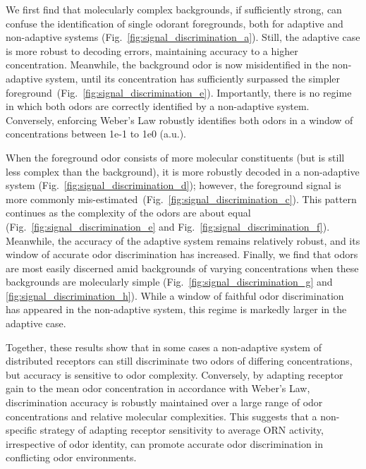 We first find that molecularly complex backgrounds, if sufficiently strong, can confuse the identification of single odorant foregrounds, both for adaptive and non-adaptive systems (Fig.~\ref{fig:signal_discrimination_a}). Still, the adaptive case is more robust to decoding errors, maintaining accuracy to a higher concentration. Meanwhile, the background odor is now misidentified in the non-adaptive system, until its concentration has sufficiently surpassed the simpler foreground~(Fig.~\ref{fig:signal_discrimination_e}). Importantly, there is no regime in which both odors are correctly identified by a non-adaptive system. Conversely, enforcing Weber's Law robustly identifies both odors in a window of concentrations between 1e-1 to 1e0 (a.u.).

When the foreground odor consists of more molecular constituents (but is still less complex than the background), it is more robustly decoded in a non-adaptive system (Fig.~\ref{fig:signal_discrimination_d}); however, the foreground signal is more commonly mis-estimated~(Fig.~\ref{fig:signal_discrimination_c}). This pattern continues as the complexity of the odors are about equal (Fig.~\ref{fig:signal_discrimination_e} and Fig.~\ref{fig:signal_discrimination_f}). Meanwhile, the accuracy of the adaptive system remains relatively robust, and its window of accurate odor discrimination has increased. Finally, we find that odors are most easily discerned amid backgrounds of varying concentrations when these backgrounds are molecularly simple (Fig.~\ref{fig:signal_discrimination_g} and \ref{fig:signal_discrimination_h}). While a window of faithful odor discrimination has appeared in the non-adaptive system, this regime is markedly larger in the adaptive case.

Together, these results show that in some cases a non-adaptive system of distributed receptors can still discriminate two odors of differing concentrations, but accuracy is sensitive to odor complexity. Conversely, by adapting receptor gain to the mean odor concentration in accordance with Weber's Law, discrimination accuracy is robustly maintained over a large range of odor concentrations and relative molecular complexities. This suggests that a non-specific strategy of adapting receptor sensitivity to average ORN activity, irrespective of odor identity, can promote accurate odor discrimination in conflicting odor environments.





